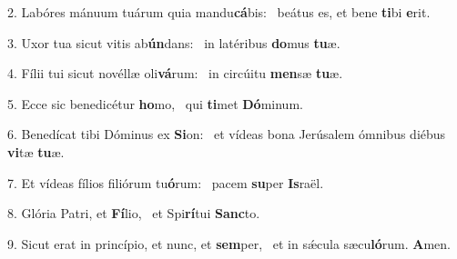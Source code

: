 2. Labóres mánuum tuárum quia mandu\textbf{cá}bis: \ast\  beátus es, et bene \textbf{ti}bi \textbf{e}rit.\

3. Uxor tua sicut vitis ab\textbf{ún}dans: \ast\  in latéribus \textbf{do}mus \textbf{tu}æ.\

4. Fílii tui sicut novéllæ oli\textbf{vá}rum: \ast\  in circúitu \textbf{men}sæ \textbf{tu}æ.\

5. Ecce sic benedicétur \textbf{ho}mo, \ast\  qui \textbf{ti}met \textbf{Dó}minum.\

6. Benedícat tibi Dóminus ex \textbf{Si}on: \ast\  et vídeas bona Jerúsalem ómnibus diébus \textbf{vi}tæ \textbf{tu}æ.\

7. Et vídeas fílios filiórum tu\textbf{ó}rum: \ast\  pacem \textbf{su}per \textbf{Is}raël.\

8. Glória Patri, et \textbf{Fí}lio, \ast\  et Spi\textbf{rí}tui \textbf{Sanc}to.\

9. Sicut erat in princípio, et nunc, et \textbf{sem}per, \ast\  et in sǽcula sæcu\textbf{ló}rum. \textbf{A}men.\

